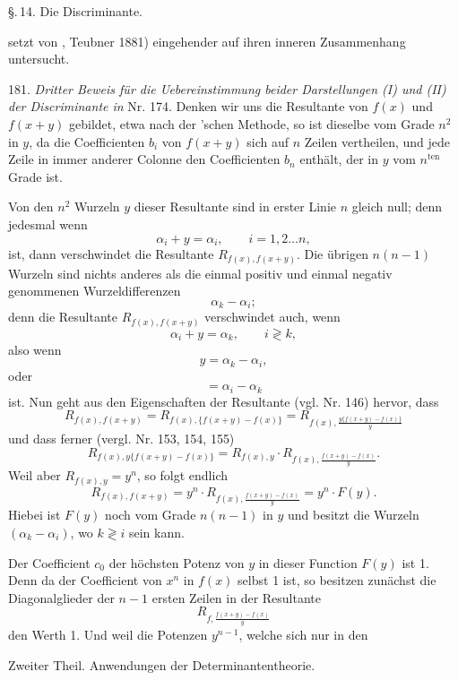 \documentclass[11pt]{article}
\providecommand{\gesperrt}[1]{\textls[130]{#1}}
\providecommand{\weberpage}[1]{}
\begin{document}
\weberpage{193}
\S.\,14. Die Discriminante.

setzt von \gesperrt{Walter}, Teubner 1881) eingehender auf ihren inneren Zusammenhang untersucht.

181. \textit{Dritter Beweis für die Uebereinstimmung beider Darstellungen (I) und (II) der Discriminante in} Nr. 174. Denken wir uns
die Resultante von $f(x)$ und $f(x+y)$ gebildet, etwa nach der \gesperrt{Sylvester}'schen Methode, so ist dieselbe vom Grade $n^2$ in $y$, da die Coefficienten $b_i$ von $f(x+y)$ sich auf $n$ Zeilen vertheilen, und jede Zeile
in immer anderer Colonne den Coefficienten $b_n$ enthält, der in $y$ vom
$n^{\text{ten}}$ Grade ist.

Von den $n^2$ Wurzeln $y$ dieser Resultante sind in erster Linie $n$
gleich null; denn jedesmal wenn
\[
\alpha_i + y = \alpha_i, \qquad i = 1, 2 \ldots n,
\]
ist, dann verschwindet die Resultante $R_{f(x),f(x+y)}$. Die übrigen $n(n-1)$
Wurzeln sind nichts anderes als die einmal positiv und einmal negativ
genommenen Wurzeldifferenzen
\[
\alpha_k - \alpha_i;
\]
denn die Resultante $R_{f(x),f(x+y)}$ verschwindet auch, wenn
\[
\alpha_i + y = \alpha_k, \qquad i \gtrless k,
\]
also wenn
\[
y = \alpha_k - \alpha_i,
\]
oder
\[
= \alpha_i - \alpha_k
\]
ist. Nun geht aus den Eigenschaften der Resultante (vgl. Nr. 146)
hervor, dass
\[
R_{f(x),f(x+y)} = R_{f(x),\{f(x+y)-f(x)\}} = R_{f(x), \frac{y\{f(x+y)-f(x)\}}{y}}
\]
und dass ferner (vergl. Nr. 153, 154, 155)
\[
R_{f(x), y\{f(x+y)-f(x)\}} = R_{f(x),y} \cdot R_{f(x), \frac{f(x+y)-f(x)}{y}}.
\]
Weil aber $R_{f(x),y} = y^n$, so folgt endlich
\[
R_{f(x),f(x+y)} = y^n \cdot R_{f(x), \frac{f(x+y)-f(x)}{y}} = y^n \cdot F(y).
\]
Hiebei ist $F(y)$ noch vom Grade $n(n-1)$ in $y$ und besitzt die
Wurzeln $(\alpha_k - \alpha_i)$, wo $k \gtrless i$ sein kann.

Der Coefficient $c_0$ der höchsten Potenz von $y$ in dieser Function $F(y)$
ist 1. Denn da der Coefficient von $x^n$ in $f(x)$ selbst 1 ist, so besitzen
zunächst die Diagonalglieder der $n-1$ ersten Zeilen in der Resultante
\[
R_{f, \frac{f(x+y)-f(x)}{y}}
\]
den Werth 1. Und weil die Potenzen $y^{n-1}$, welche sich nur in den


\weberpage{194}
Zweiter Theil. Anwendungen der Determinantentheorie.
\end{document}
